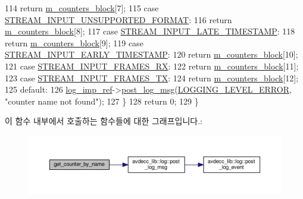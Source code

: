 \begin{DoxyCode}
114         \textcolor{keywordflow}{return} \hyperlink{classavdecc__lib_1_1stream__input__counters__response__imp_a4280ad18b84e17884a0eca22237e22a9}{m\_counters\_block}[7];
115     \textcolor{keywordflow}{case} \hyperlink{namespaceavdecc__lib_a831be56dba8ac423258a9374a1202df4a5a8fc53c8728128a42eacecfd7b0b767}{STREAM\_INPUT\_UNSUPPORTED\_FORMAT}:
116         \textcolor{keywordflow}{return} \hyperlink{classavdecc__lib_1_1stream__input__counters__response__imp_a4280ad18b84e17884a0eca22237e22a9}{m\_counters\_block}[8];
117     \textcolor{keywordflow}{case} \hyperlink{namespaceavdecc__lib_a831be56dba8ac423258a9374a1202df4a5c1b67849a2f0369eacd9cb0a34cd35b}{STREAM\_INPUT\_LATE\_TIMESTAMP}:
118         \textcolor{keywordflow}{return} \hyperlink{classavdecc__lib_1_1stream__input__counters__response__imp_a4280ad18b84e17884a0eca22237e22a9}{m\_counters\_block}[9];
119     \textcolor{keywordflow}{case} \hyperlink{namespaceavdecc__lib_a831be56dba8ac423258a9374a1202df4a275f10a1321b0f35ad3a85706c9a2992}{STREAM\_INPUT\_EARLY\_TIMESTAMP}:
120         \textcolor{keywordflow}{return} \hyperlink{classavdecc__lib_1_1stream__input__counters__response__imp_a4280ad18b84e17884a0eca22237e22a9}{m\_counters\_block}[10];
121     \textcolor{keywordflow}{case} \hyperlink{namespaceavdecc__lib_a831be56dba8ac423258a9374a1202df4ab39ecebabdd284a4a76d165ce5ed661d}{STREAM\_INPUT\_FRAMES\_RX}:
122         \textcolor{keywordflow}{return} \hyperlink{classavdecc__lib_1_1stream__input__counters__response__imp_a4280ad18b84e17884a0eca22237e22a9}{m\_counters\_block}[11];
123     \textcolor{keywordflow}{case} \hyperlink{namespaceavdecc__lib_a831be56dba8ac423258a9374a1202df4a0b0a7b71f908ef6d8bbafd7d9a36ec57}{STREAM\_INPUT\_FRAMES\_TX}:
124         \textcolor{keywordflow}{return} \hyperlink{classavdecc__lib_1_1stream__input__counters__response__imp_a4280ad18b84e17884a0eca22237e22a9}{m\_counters\_block}[12];
125     \textcolor{keywordflow}{default}:
126         \hyperlink{namespaceavdecc__lib_acbe3e2a96ae6524943ca532c87a28529}{log\_imp\_ref}->\hyperlink{classavdecc__lib_1_1log_a68139a6297697e4ccebf36ccfd02e44a}{post\_log\_msg}(\hyperlink{namespaceavdecc__lib_a501055c431e6872ef46f252ad13f85cdaf2c4481208273451a6f5c7bb9770ec8a}{LOGGING\_LEVEL\_ERROR}, \textcolor{stringliteral}{"counter
       name not found"});
127     \}
128     \textcolor{keywordflow}{return} 0;
129 \}
\end{DoxyCode}


이 함수 내부에서 호출하는 함수들에 대한 그래프입니다.\+:
\nopagebreak
\begin{figure}[H]
\begin{center}
\leavevmode
\includegraphics[width=350pt]{classavdecc__lib_1_1stream__input__counters__response__imp_a5746c406e06afbbd5f35819f8e378476_cgraph}
\end{center}
\end{figure}



